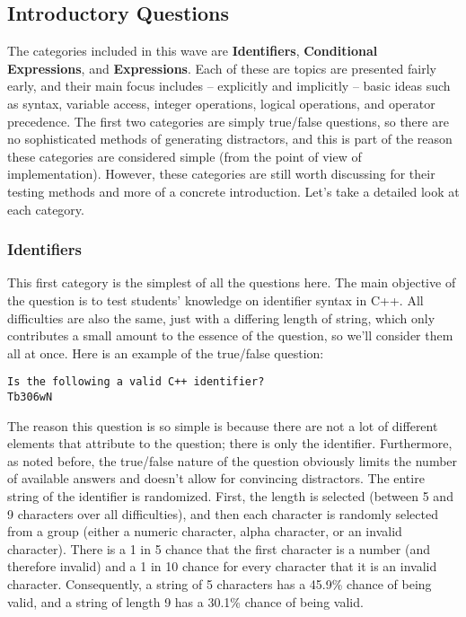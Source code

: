 \documentclass{article}
\begin{document}
\subsection{Introductory Questions} \label{subsec-introductory_questions}
The categories included in this wave are \textbf{Identifiers}, \textbf{Conditional Expressions}, and \textbf{Expressions}. Each of these are topics are presented fairly early, and their main
focus includes -- explicitly and implicitly -- basic ideas such as syntax, variable access, integer operations, logical operations, and operator precedence.
The first two categories are simply true/false questions, so there are no sophisticated methods of generating
distractors, and this is part of the reason these categories are considered simple (from the point of view of implementation). However, these categories are still
worth discussing for their testing methods and more of a concrete introduction. Let's take a detailed look at each category.

\subsubsection{Identifiers} \label{subsubsec-identifiers}

This first category is the simplest of all the questions here. The main objective of the question is to test students' knowledge on identifier syntax in C++.
All difficulties are also the same, just with a differing length of string, which only contributes a small amount to the essence of the question, so we'll consider
them all at once.
Here is an example of the true/false question:

\begin{lstlisting}[breaklines=true, caption={A question on identifiers.}, label=lst-identifiers]
Is the following a valid C++ identifier?
Tb306wN 
\end{lstlisting}


The reason this question is so simple is because there are not a lot of different elements that attribute to the question; there is only the identifier.
Furthermore, as noted before, the true/false nature of the question obviously limits the number of available answers and doesn't allow for convincing distractors.
The entire string of the identifier is randomized. First, the length is selected (between 5 and 9 characters over all difficulties), and then each character is randomly selected from
a group (either a numeric character, alpha character, or an invalid character). There is a 1 in 5 chance that the first character is a number (and therefore invalid)
and a 1 in 10 chance for every character that it is an invalid character. Consequently, a string of 5 characters has a 45.9\% chance of being valid, and a string of
length 9 has a 30.1\% chance of being valid.
\end{document}
